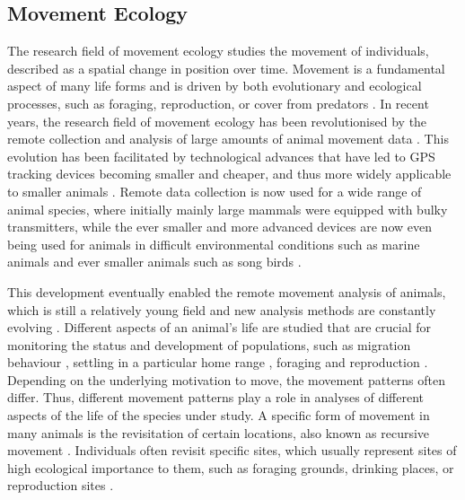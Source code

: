 \subsection{Movement Ecology}
The research field of movement ecology studies the movement of individuals, described as a spatial change in position over time. Movement is a fundamental aspect of many life forms and is driven by both evolutionary and ecological processes, such as foraging, reproduction, or cover from predators \parencite{nathan2008movement}. In recent years, the research field of movement ecology has been revolutionised by the remote collection and analysis of large amounts of animal movement data \parencite{urbano2010wildlife,williams2020optimizing}. This evolution has been facilitated by technological advances that have led to GPS tracking devices becoming smaller and cheaper, and thus more widely applicable to smaller animals \parencite{kays2015terrestrial,tomkiewicz2010global}. Remote data collection is now used for a wide range of animal species, where initially mainly large mammals were equipped with bulky transmitters, while the ever smaller and more advanced devices are now even being used for animals in difficult environmental conditions such as marine animals and ever smaller animals such as song birds \parencite{hussey2015aquatic,kays2015terrestrial,tomkiewicz2010global}. 

This development eventually enabled the remote movement analysis of animals, which is still a relatively young field and new analysis methods are constantly evolving \parencite{nathan2013milestone}. Different aspects of an animal's life are studied that are crucial for monitoring the status and development of populations, such as migration behaviour \parencite{fudickar2021animal}, settling in a particular home range \parencite{kane2022understanding, martins2021territorial}, foraging \parencite{berger2015recursive} and reproduction \parencite{bowgen2022curves, picardi2020analysis}. Depending on the underlying motivation to move, the movement patterns often differ. Thus, different movement patterns play a role in analyses of different aspects of the life of the species under study. A specific form of movement in many animals is the revisitation of certain locations, also known as recursive movement \parencite{berger2015recursive}. Individuals often revisit specific sites, which usually represent sites of high ecological importance to them, such as foraging grounds, drinking places, or reproduction sites \parencite{bracis2018revisit}.

